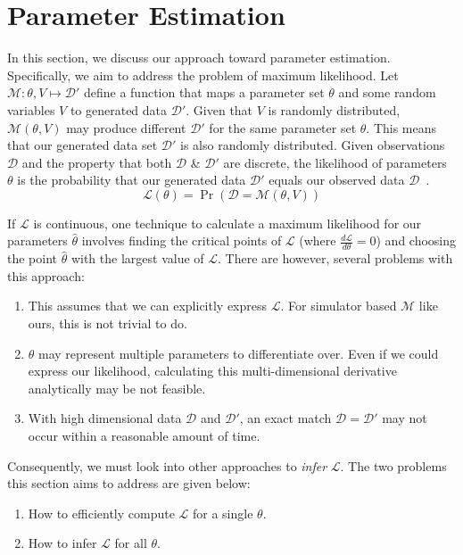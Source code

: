 \section{Parameter Estimation}\label{sec:pe}
In this section, we discuss our approach toward parameter estimation.
Specifically, we aim to address the problem of maximum likelihood.
Let $\mathcal{M} : \theta, V \mapsto \mathcal{D}'$ define a function that maps a parameter set $\theta$ and some
random variables $V$ to generated data $\mathcal{D}'$.
Given that $V$ is randomly distributed, $\mathcal{M}(\theta, V)$ may produce different $\mathcal{D}'$ for the same
parameter set $\theta$.
This means that our generated data set $\mathcal{D}'$ is also randomly distributed. %
Given observations $\mathcal{D}$ and the property that both $\mathcal{D}$ \& $\mathcal{D}'$ are discrete,
the likelihood of parameters $\theta$ is the probability that our generated data
$\mathcal{D}'$ equals our observed data $\mathcal{D}$~\cite{liepeABCSysBioApproximateBayesian2010}.
\begin{equation}
    \mathcal{L}(\theta) = \Pr(\mathcal{D} = \mathcal{M}(\theta, V))
\end{equation}

If $\mathcal{L}$ is continuous, one technique to calculate a maximum likelihood for our parameters $\hat{\theta}$
involves finding the critical points of $\mathcal{L}$ (where $\frac{d\mathcal{L}}{d\theta} = 0$) and choosing the point
$\hat{\theta}$ with the largest value of $\mathcal{L}$.
There are however, several problems with this approach:
\begin{enumerate}
    \item This assumes that we can explicitly express $\mathcal{L}$.
        For simulator based $\mathcal{M}$ like ours, this is not trivial to do.
    \item $\theta$ may represent multiple parameters to differentiate over.
        Even if we could express our likelihood, calculating this multi-dimensional derivative analytically may be
        not feasible.
    \item With high dimensional data $\mathcal{D}$ and $\mathcal{D}'$, an exact match
        $\mathcal{D} = \mathcal{D}'$ may not occur within a reasonable amount of time.
\end{enumerate}
Consequently, we must look into other approaches to \textit{infer} $\mathcal{L}$.
The two problems this section aims to address are given below:
\begin{enumerate}
    \item How to efficiently compute $\mathcal{L}$ for a single $\theta$.
    \item How to infer $\mathcal{L}$ for all $\theta$.
\end{enumerate}

